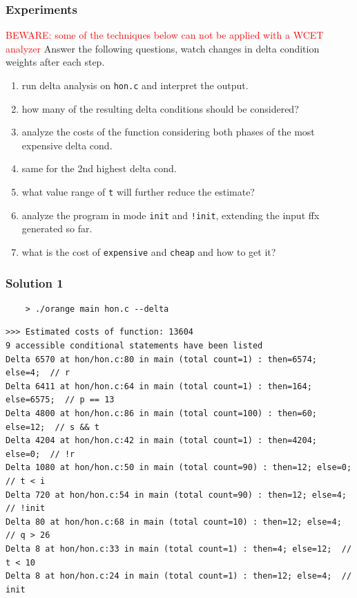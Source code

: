 \documentclass{beamer}
\begin{document}
\begin{frame}[fragile]
  \frametitle{Experiments}
  \textcolor{red}{BEWARE: some of the techniques below can not be applied with a WCET analyzer}
  Answer the following questions, watch changes in delta condition weights after each step.
  \begin{enumerate}
    \item run delta analysis on {\tt hon.c} and interpret the output.
    \item how many of the resulting delta conditions should be considered? 
    \item analyze the costs of the function considering both phases of the most expensive delta cond.
    \item same for the 2nd highest delta cond.
    \item what value range of {\tt t} will further reduce the estimate?
    \item analyze the program in mode {\tt init} and {\tt !init}, extending the input ffx generated so far.
    \item what is the cost of {\tt expensive} and {\tt cheap} and how to get it?
  \end{enumerate}
\end{frame}



\begin{frame}[fragile]
  \frametitle{Solution 1}
  {\small
  \begin{verbatim}
    > ./orange main hon.c --delta
  \end{verbatim}
  }
  {\tiny
  \begin{verbatim}
>>> Estimated costs of function: 13604
9 accessible conditional statements have been listed
Delta 6570 at hon/hon.c:80 in main (total count=1) : then=6574; else=4;  // r
Delta 6411 at hon/hon.c:64 in main (total count=1) : then=164; else=6575;  // p == 13
Delta 4800 at hon/hon.c:86 in main (total count=100) : then=60; else=12;  // s && t
Delta 4204 at hon/hon.c:42 in main (total count=1) : then=4204; else=0;  // !r
Delta 1080 at hon/hon.c:50 in main (total count=90) : then=12; else=0;  // t < i
Delta 720 at hon/hon.c:54 in main (total count=90) : then=12; else=4;  // !init
Delta 80 at hon/hon.c:68 in main (total count=10) : then=12; else=4;  // q > 26
Delta 8 at hon/hon.c:33 in main (total count=1) : then=4; else=12;  // t < 10
Delta 8 at hon/hon.c:24 in main (total count=1) : then=12; else=4;  // init
  \end{verbatim}
  }
\end{frame}
\end{document}
